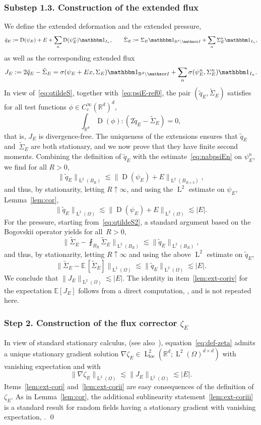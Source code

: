 \documentclass[10pt]{amsart}
\let\mathcal\mathscr
\let\mathds\mathbbm
\theoremstyle{plain}
\theoremstyle{definition}
\newcommand{\R}{\mathbb R}
\newcommand{\Ic}{\mathcal I}
\newcommand{\loc}{{\operatorname{loc}}}
\newcommand{\D}{\operatorname{D}}
\newcommand{\Ld}{\operatorname{L}}
\newcommand{\step}[1]{\subsubsection*{Step #1}}
\newcommand{\substep}[1]{\subsubsection*{Substep #1}}
\newcommand{\expec}[1]{\mathbb{E}\left[ #1 \right]}
\newcommand{\expecmm}[1]{\mathbb{E}\,[ #1 ]}
\begin{document}
\substep{1.3. Construction of the extended flux}
We define the extended deformation and the extended pressure,
\[\tilde q_E:=\D(\psi_E)+E+\sum_n\D(\psi_E^n)\mathds1_{I_n},\qquad \tilde\Sigma_E:=\Sigma_E\mathds1_{\R^d\setminus\Ic}+\sum_n \Sigma_E^n\mathds1_{I_n},\]
as well as the corresponding extended flux
\begin{equation}\label{eq:def-J}
J_E:=2\tilde q_E-\tilde\Sigma_E=\sigma(\psi_E+Ex,\Sigma_E)\mathds1_{\R^d\setminus\Ic}+\sum_n\sigma(\psi_E^{n},\Sigma_E^{n})\mathds1_{I_n}.
\end{equation}
In view of~\eqref{eq:qtildeS}, together with~\eqref{eq:psiE-ref0}, the pair $(\tilde q_E,\tilde \Sigma_E)$ satisfies for all test functions $\phi\in C^\infty_c(\R^d)^d$,
\begin{equation}\label{eq:qtildeS2}
\int_{\R^d}\D(\phi):(2\tilde q_E-\tilde\Sigma_E)=0,
\end{equation}
that is, $J_E$ is divergence-free.
The uniqueness of the extensions ensures that $\tilde q_E$ and~$\tilde\Sigma_E$ are both stationary, and we now prove that they have finite second moments.
Combining the definition of $\tilde q_E$ with the estimate~\eqref{eq:nabpsiEn} on $\psi_E^n$, we find for all $R>0$,
\[\|\tilde q_E\|_{\Ld^2(B_R)}\lesssim \|\!\D(\psi_E)+E\|_{\Ld^2(B_{R+3})},\]
and thus, by stationarity, letting $R\uparrow\infty$, and using the $\Ld^2$ estimate on $\psi_E$, \cf Lemma~\ref{lem:cor},
\[\|\tilde q_E\|_{\Ld^2(\Omega)}\lesssim \|\!\D(\psi_E)+E\|_{\Ld^2(\Omega)}\lesssim |E|.\]
For the pressure, starting from~\eqref{eq:qtildeS2}, a standard argument based on the Bogovskii operator yields for all~$R>0$,
\begin{equation*}
\Big\|\tilde\Sigma_E-\fint_{B_R}\tilde\Sigma_E\Big\|_{\Ld^2(B_R)}\lesssim \|\tilde q_E\|_{\Ld^2(B_R)},
\end{equation*}
and thus, by stationarity, letting $R\uparrow\infty$ and using the above $\Ld^2$ estimate on $\tilde q_E$,
\begin{equation*}
\|\tilde\Sigma_E-\expecmm{\tilde\Sigma_E}\|_{\Ld^2(\Omega)}\lesssim \|\tilde q_E\|_{\Ld^2(\Omega)}\lesssim |E|.
\end{equation*}
We conclude that $\|J_E\|_{\Ld^2(\Omega)}\lesssim|E|$.
The identity in item~\eqref{lem:ext-coriv} for the expectation $\expec{J_E}$ follows from a direct computation, \cf \cite[Lem.\,4.2]{D-20}, and is not repeated here.

\step{2. Construction of the flux corrector $\zeta_E$}
In view of standard stationary calculus, \eg \cite[\S 7]{JKO94} (see also~\cite[Proof of Lemma~1]{GNO-reg}),
equation~\eqref{eq:def-zeta} admits a unique stationary gradient solution $\nabla\zeta_{E}\in\Ld^2_\loc(\R^d;\Ld^2(\Omega)^{d\times d})$ with vanishing expectation and with
\[\|\nabla\zeta_E\|_{\Ld^2(\Omega)}\lesssim \|J_E\|_{\Ld^2(\Omega)}\lesssim |E|.\]
Items~\eqref{lem:ext-cori} and~\eqref{lem:ext-corii} are easy consequences of the definition of $\zeta_E$. As in Lemma~\ref{lem:cor}, the additional sublinearity statement~\eqref{lem:ext-coriii} is a standard result for random fields having a stationary gradient with vanishing expectation, \cf \eg \cite[\S 7]{JKO94}.
\qed
\end{document}
